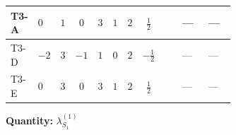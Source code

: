 \documentclass[8pt]{article}
\begin{document}
\begin{landscape}
\begin{longtable}{@{}llcccccc >{\raggedright\arraybackslash}p{0.21\linewidth} >{\raggedright\arraybackslash}p{0.21\linewidth} >{\raggedright\arraybackslash}p{0.21\linewidth}@{}}
\midrule
T3-A & $0$ & $1$ & $0$ & $3$ & $1$ & $2$ & $\frac{1}{2}$ & \scriptsize\adjustbox{max width=\linewidth}{$\begin{gathered} -8 \operatorname{Tr}\!\left({y_1}\,\left({y_1}\right)^{\dagger}\,{y_1}\,\left({y_1}\right)^{\dagger}\right)\end{gathered}$} & --- & --- \\
\midrule
T3-D & $-2$ & $3$ & $-1$ & $1$ & $0$ & $2$ & $-\frac{1}{2}$ & \scriptsize\adjustbox{max width=\linewidth}{$\begin{gathered} -3 \operatorname{Tr}\!\left({y_1}\,\left({y_1}\right)^{\dagger}\,{y_1}\,\left({y_1}\right)^{\dagger}\right)\end{gathered}$} & --- & --- \\
\midrule
T3-E & $0$ & $3$ & $0$ & $3$ & $1$ & $2$ & $\frac{1}{2}$ & \scriptsize\adjustbox{max width=\linewidth}{$\begin{gathered} -3 \operatorname{Tr}\!\left({y_1}\,\left({y_1}\right)^{\dagger}\,{y_1}\,\left({y_1}\right)^{\dagger}\right)\end{gathered}$} & --- & --- \\
\midrule
\bottomrule
\end{longtable}
\clearpage
\noindent\textbf{Quantity: }$\lambda_{S_1}^{(1)}$\par\smallskip

\end{landscape}
\end{document}
